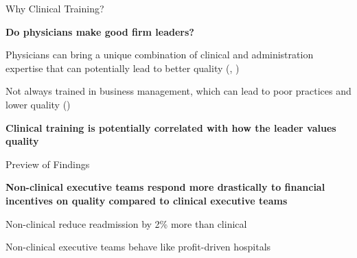 \documentclass[notes,11pt, aspectratio=169]{beamer}
\newenvironment{wideitemize}{\itemize\addtolength{\itemsep}{10pt}}{\enditemize}
\begin{document}
\begin{frame}{Why Clinical Training?}

\textbf{Do physicians make good firm leaders?}

\vspace{2mm}

\begin{wideitemize}
    \item Physicians can bring a unique combination of clinical and administration expertise that can potentially lead to better quality \scriptsize (\cite{Stajduhar_2023}, \cite{Ahmed_2022}) \normalsize

    \vspace{2mm}
    
    \item Not always trained in business management, which can lead to poor practices and lower quality \scriptsize (\cite{HarvardBusinessReview2018})
\end{wideitemize}

\vspace{10mm}

\textbf{Clinical training is potentially correlated with how the leader values quality}
\end{frame}

\begin{frame}{Preview of Findings}

\textbf{Non-clinical executive teams respond more drastically to financial incentives on quality compared to clinical executive teams}

\vspace{2mm}

\begin{wideitemize}
    \item Non-clinical reduce readmission by 2\% more than clinical
    \item Non-clinical executive teams behave like profit-driven hospitals
\end{wideitemize}
\end{frame}
\end{document}
